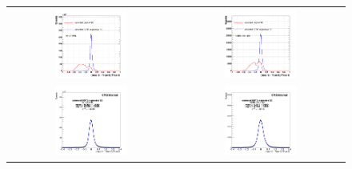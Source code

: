 \begin{figure}[bh]
  \begin{center}
    \begin{tabular}{cc}
      \includegraphics[width=0.45\textwidth]{chapters/Zprime/Saturation/images/FlatPt/Result/Barrel_Endcap/compare_BDTG_Barrel_Endcap_enSC_B_s.png} &
      \includegraphics[width=0.45\textwidth]{chapters/Zprime/Saturation/images/FlatPt/Result/Barrel_Endcap/compare_BDTG_Barrel_Endcap_enSC_E_s.png} \\
      \includegraphics[width=0.45\textwidth]{chapters/Zprime/Saturation/images/FlatPt/Result/Barrel_Endcap/fit_BDTG_Barrel_Endcap_B_reg_s.png} &
      \includegraphics[width=0.45\textwidth]{chapters/Zprime/Saturation/images/FlatPt/Result/Barrel_Endcap/fit_BDTG_Barrel_Endcap_E_reg_s.png}

\end{tabular}
\end{center}
\end{figure}

